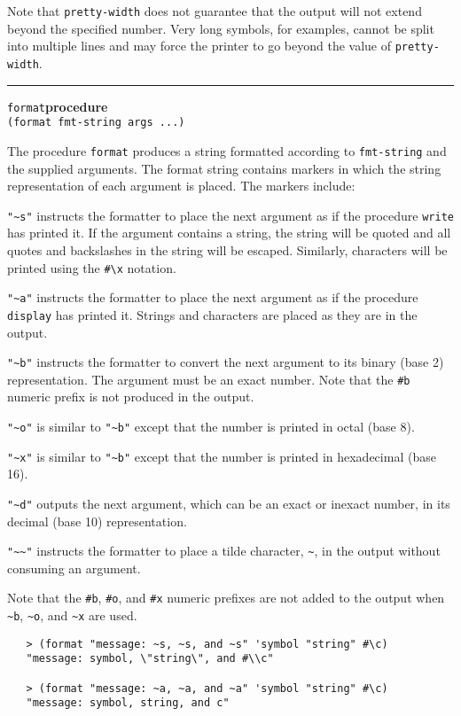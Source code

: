 \documentclass[onecolumn, 12pt, twoside, openright, dvipdfm]{book}
\makeatletter
\newcommand{\idxlabeldefun}[5]{
\vspace{1ex}
\rule{\textwidth}{2pt}
{\phantomsection\index{#1@\texttt{#2}}\label{#3}{\Large\texttt{#4}}\hfill\textbf{#5}}\\}
\newcommand{\idxdefun}[3]{\idxlabeldefun{#1}{#2}{#1}{#2}{#3}}
\newcommand{\defun}[2]{\idxdefun{#1}{#1}{#2}}
\makeatother
\begin{document}
Note that \texttt{pretty-width} does not guarantee that 
the output will not extend beyond the specified number.  Very long
symbols, for examples, cannot be split into multiple lines and may
force the printer to go beyond the value of \texttt{pretty-width}.

\defun{format}{procedure}
\texttt{(format fmt-string args ...)}

The procedure \texttt{format} produces a string formatted according
to \texttt{fmt-string} and the supplied
arguments.  The format string contains markers in which the string
representation of each argument is placed.  The markers include:


\verb|"~s"| instructs the formatter to place the next argument
as if the procedure \texttt{write} has printed it.  If the argument
contains a string, the string will be quoted and all quotes and
backslashes in the string will be escaped.  Similarly, characters
will be printed using the \verb|#\x| notation.

\verb|"~a"| instructs the formatter to place the next argument
as if the procedure \texttt{display} has printed it.  Strings and
characters are placed as they are in the output.

\verb|"~b"| instructs the formatter to convert the next
argument to its binary (base 2) representation.  The argument must be an
exact number.  Note that the \texttt{\#b} numeric prefix is not
produced in the output.

\verb|"~o"| is similar to \verb|"~b"|  except that
the number is printed in octal (base 8).

\verb|"~x"|  is similar to \verb|"~b"|  except that
the number is printed in hexadecimal (base 16).

\verb|"~d"|  outputs the next argument, which can be an
exact or inexact number, in its decimal (base 10) representation.

\verb|"~~"|  instructs the formatter to place a tilde
character, \verb|~|, in the output without consuming an
argument.

Note that the \texttt{\#b}, \texttt{\#o}, and \texttt{\#x} numeric
prefixes are not added to the output when \verb|~b|, \verb|~o|, and
\verb|~x| are used.

\begin{verbatim}
   > (format "message: ~s, ~s, and ~s" 'symbol "string" #\c)
   "message: symbol, \"string\", and #\\c"

   > (format "message: ~a, ~a, and ~a" 'symbol "string" #\c)
   "message: symbol, string, and c"
\end{verbatim}
\end{document}
